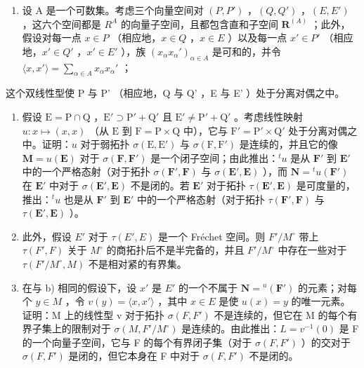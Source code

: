 \begin{enumerate}
\def\labelenumi{\arabic{enumi})}
\setcounter{enumi}{8}
\tightlist
\item
  设 A 是一个可数集。考虑三个向量空间对 \((P, P')\) ，\((Q, Q')\) ，\((E, E')\) ，这六个空间都是 \(R^{A}\) 的向量子空间，且都包含直和子空间 \(\mathbf{R}^{(A)}\) ；此外，假设对每一点 \(x \in P\) （相应地，\(x \in Q\) ，\(x \in E\) ）以及每一点 \(x' \in P'\) （相应地，\(x' \in Q'\) ，\(x' \in E'\) ），族 \((x_{\alpha}x_{\alpha}')_{\alpha \in A}\) 是可和的，并令 \(\langle x, x' \rangle = \sum_{\alpha \in A} x_{\alpha}x_{\alpha}'\) ；
\end{enumerate}

这个双线性型使 P 与 P' （相应地，Q 与 Q' ，E 与 E' ）处于分离对偶之中。

\begin{enumerate}
\def\labelenumi{\alph{enumi})}
\item
  假设 \(\mathrm{E} = \mathrm{P} \cap \mathrm{Q}\) ，\(\mathrm{E}' \supset \mathrm{P}' + \mathrm{Q}'\) 且 \(\mathrm{E}' \neq \mathrm{P}' + \mathrm{Q}'\) 。考虑线性映射 \(u: x \mapsto (x, x)\) （从 \(\mathrm{E}\) 到 \(\mathrm{F} = \mathrm{P} \times \mathrm{Q}\) 中），它与 \(\mathrm{F}' = \mathrm{P}' \times \mathrm{Q}'\) 处于分离对偶之中。证明：\(u\) 对于弱拓扑 \(\sigma(\mathrm{E}, \mathrm{E}')\) 与 \(\sigma(\mathrm{F}, \mathrm{F}')\) 是连续的，并且它的像 \(\mathbf{M} = u(\mathbf{E})\) 对于 \(\sigma(\mathbf{F}, \mathbf{F}')\) 是一个闭子空间；由此推出：\(^t u\) 是从 \(\mathbf{F}'\) 到 \(\mathbf{E}'\) 中的一个严格态射（对于拓扑 \(\sigma(\mathbf{F}', \mathbf{F})\) 与 \(\sigma(\mathbf{E}', \mathbf{E})\) ），而 \(\mathbf{N} = {}^{t}u(\mathbf{F}')\) 在 \(\mathbf{E}'\) 中对于 \(\sigma(\mathbf{E}', \mathbf{E})\) 不是闭的。若 \(\mathbf{E}'\) 对于拓扑 \(\tau(\mathbf{E}', \mathbf{E})\) 是可度量的，推出：\(^t u\) 也是从 \(\mathbf{F}'\) 到 \(\mathbf{E}'\) 中的一个严格态射（对于拓扑 \(\tau(\mathbf{F}', \mathbf{F})\) 与 \(\tau(\mathbf{E}', \mathbf{E})\) ）。
\item
  此外，假设 \(E'\) 对于 \(\tau(E', E)\) 是一个 Fréchet 空间。则 \(F'/M^{\circ}\) 带上 \(\tau(F', F)\) 关于 \(M^{\circ}\) 的商拓扑后不是半完备的，并且 \(F'/M^{\circ}\) 中存在一些对于 \(\tau(F'/M^{\circ}, M)\) 不是相对紧的有界集。
\item
  在与 b) 相同的假设下，设 \(x'\) 是 \(E'\) 的一个不属于 \(\mathbf{N} = {}^{u}(\mathbf{F}')\) 的元素；对每个 \(y \in M\) ，令 \(v(y) = \langle x, x' \rangle\) ，其中 \(x \in E\) 是使 \(u(x) = y\) 的唯一元素。证明：M 上的线性型 v 对于拓扑 \(\sigma(F, F')\) 不是连续的，但它在 M 的每个有界子集上的限制对于 \(\sigma(M, F'/M^{\circ})\) 是连续的。由此推出：\(L = v^{-1}(0)\) 是 F 的一个向量子空间，它与 F 的每个有界闭子集（对于 \(\sigma(F, F')\) ）的交对于 \(\sigma(F, F')\) 是闭的，但它本身在 F 中对于 \(\sigma(F, F')\) 不是闭的。
\end{enumerate}

